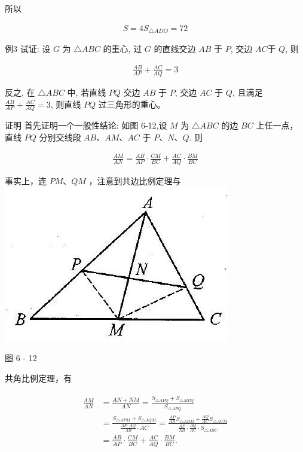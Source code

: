 \documentclass[10pt]{article}
\begin{document}
所以

\begin{align*}
S=4 S_{\triangle A D O}=72
\end{align*}

例3 试证: 设 $G$ 为 $\triangle A B C$ 的重心, 过 $G$ 的直线交边 $A B$ 于 $P$, 交边 $A C$于 $Q$, 则

\begin{align*}
\frac{A B}{A P}+\frac{A C}{A Q}=3
\end{align*}

反之, 在 $\triangle A B C$ 中, 若直线 $P Q$ 交边 $A B$ 于 $P$, 交边 $A C$ 于 $Q$, 且满足 $\frac{A B}{A P}+\frac{A C}{A Q}=3$, 则直线 $P Q$ 过三角形的重心。

证明 首先证明一个一般性结论: 如图 6-12,设 $M$ 为 $\triangle A B C$ 的边 $B C$ 上任一点，直线 $P Q$ 分别交线段 $A B 、 A M 、 A C$ 于 $P 、 N 、 Q$. 则

\begin{align*}
\frac{A M}{A N}=\frac{A B}{A P} \cdot \frac{C M}{B C}+\frac{A C}{A Q} \cdot \frac{B M}{B C} \tag{6-15}
\end{align*}

事实上，连 $P M 、 Q M$ ，注意到共边比例定理与\\
\includegraphics[max width=\textwidth, center]{2024_10_30_2c8f45efd4a519b08e1ag-066(1)}

图 6 - 12

共角比例定理，有

\begin{align*}
\begin{aligned}
\frac{A M}{A N} & =\frac{A N+N M}{A N}=\frac{S_{\triangle A P Q}+S_{\triangle M P Q}}{S_{\triangle A P Q}} \\
& =\frac{S_{\triangle A P M}+S_{\triangle A Q M}}{\frac{A P \cdot A Q}{A B} \cdot A C}=\frac{\frac{A P}{A B} S_{\triangle A B M}+\frac{A Q}{A C} S_{\triangle A C M}}{\frac{A P}{A B} \cdot \frac{A Q}{A C} \cdot S_{\triangle A B C}} \\
& =\frac{A B}{A P} \cdot \frac{C M}{B C}+\frac{A C}{A Q} \cdot \frac{B M}{B C} .
\end{aligned}
\end{align*}
\end{document}
